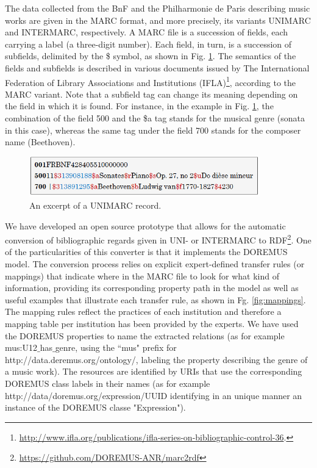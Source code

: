 \documentclass[runningheads,a4paper]{llncs}
\begin{document}
The data collected from the BnF and the Philharmonie de Paris describing music works are given in the MARC format, and more precisely, its variants UNIMARC and INTERMARC, respectively. A MARC file is a succession of fields, each carrying a label (a three-digit number). Each field, in turn, is a succession of subfields, delimited by the \$ symbol, as shown in Fig. \ref{fig:unimarc}. The semantics of the fields and subfields is described in various documents issued by The International Federation of Library Associations and Institutions  (IFLA)\footnote{\url{http://www.ifla.org/publications/ifla-series-on-bibliographic-control-36}.}, according to the MARC variant. Note that a subfield tag can change its meaning depending on the field in which it is found. For instance, in the example in Fig. \ref{fig:unimarc}, the combination of the field 500 and the \$a tag stands for the musical genre (sonata in this case), whereas the same tag under the field 700 stands for the composer name (Beethoven).

\begin{figure}
  \centering
  \includegraphics[width=10cm]{img/marc-exmpl-simple.png}
  \caption{An excerpt of a UNIMARC record.}
  \label{fig:unimarc}
\end{figure}

We have developed an open source prototype that allows for the automatic conversion of bibliographic regards given in UNI- or INTERMARC to RDF\footnote{\url{https://github.com/DOREMUS-ANR/marc2rdf}}. One of the particularities of this converter is that it implements the DOREMUS model. The conversion process relies on explicit expert-defined transfer rules (or mappings) that indicate where in the MARC file to look for what kind of information, providing its corresponding property path in the model as well as useful examples that illustrate each transfer rule, as shown in Fg. \ref{fig:mappings}. The mapping rules reflect the practices of each institution and therefore a mapping table per institution has been provided by the experts. We have used the DOREMUS properties to name the extracted relations (as for example mus:U12$\_$has$\_$genre, using the ``mus" prefix for http://data.deremus.org/ontology/, labeling the property describing the genre of a music work). The resources are identified by URIs that use the corresponding DOREMUS class labels in their names (as for example http://data/doremus.org/expression/UUID identifying in an unique manner an instance of the DOREMUS classe "Expression"). 
\end{document}
